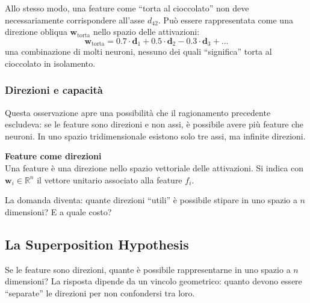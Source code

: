 Allo stesso modo, una feature come ``torta al cioccolato'' non deve necessariamente corrispondere all'asse $d_{42}$. Può essere rappresentata come una direzione obliqua $\mathbf{w}_{\text{torta}}$ nello spazio delle attivazioni:
\begin{equation}
    \mathbf{w}_{\text{torta}} = 0.7 \cdot \mathbf{d}_1 + 0.5 \cdot \mathbf{d}_2 - 0.3 \cdot \mathbf{d}_3 + \dots
\end{equation}
una combinazione di molti neuroni, nessuno dei quali ``significa'' torta al cioccolato in isolamento.
\subsubsection{Direzioni e capacità}
Questa osservazione apre una possibilità che il ragionamento precedente escludeva: se le feature sono direzioni e non assi, è possibile avere più feature che neuroni. In uno spazio tridimensionale esistono solo tre assi, ma infinite direzioni.
\begin{notebox}
\textbf{Feature come direzioni}\\
Una feature è una direzione nello spazio vettoriale delle attivazioni. Si indica con $\mathbf{w}_i \in \mathbb{R}^{n}$ il vettore unitario associato alla feature $f_i$.
\end{notebox}
La domanda diventa: quante direzioni ``utili'' è possibile stipare in uno spazio a $n$ dimensioni? E a quale costo?

\subsection{La Superposition Hypothesis}
\label{subsec:superposition_hypothesis}
Se le feature sono direzioni, quante è possibile rappresentarne in uno spazio a $n$ dimensioni? La risposta dipende da un vincolo geometrico: quanto devono essere ``separate'' le direzioni per non confondersi tra loro.
